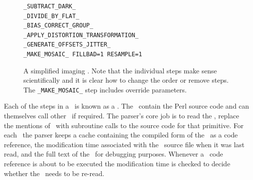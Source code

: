 \documentclass[final,authoryear,5p,times,twocolumn]{elsarticle}
\begin{document}
\begin{figure}
{
\small
\begin{verbatim}
_SUBTRACT_DARK_
_DIVIDE_BY_FLAT_
_BIAS_CORRECT_GROUP_
_APPLY_DISTORTION_TRANSFORMATION_
_GENERATE_OFFSETS_JITTER_
_MAKE_MOSAIC_ FILLBAD=1 RESAMPLE=1
\end{verbatim}
}
\caption{A simplified imaging \recipe. Note that the individual steps
  make sense scientifically and it is clear how to change the order or
  remove steps. The \texttt{\_MAKE\_MOSAIC\_} step includes override
  parameters.}
\label{fig:recipe}
\end{figure}

Each of the steps in a \recipe\ is known as a
\primitive. The \primitives\ contain the Perl source code and can
themselves call other \primitives\ if required.
The parser's core job is to read the \recipe, replace the mentions of \primitives\
with subroutine calls to the source code for that primitive. For each
\primitive\ the parser keeps a cache containing the compiled form of
the \primitive\ as a code reference, the modification time associated
with the \primitive\ source file when it was last read, and the full
text of the \primitive\ for debugging purposes. Whenever a \primitive\
code reference is about to be executed the modification time is
checked to decide whether the \primitive\ needs to be re-read.
\end{document}
